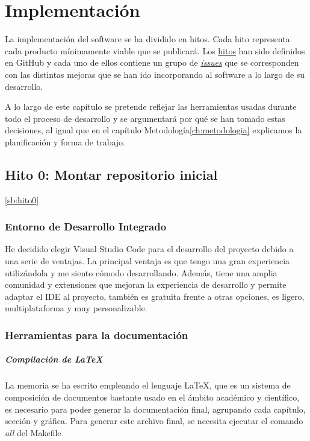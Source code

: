 \chapter{Implementación}

La implementación del software se ha dividido en hitos. Cada hito representa cada producto mínimamente viable que se publicará.
Los \href{https://github.com/RubenDelgadoPareja/TFG-Triage-Inteligente-Consulta-Medica/milestones}{hitos} han sido definidos en GitHub y
cada uno de ellos contiene un grupo de \href{https://github.com/RubenDelgadoPareja/TFG-Triage-Inteligente-Consulta-Medica/issues}{\textit{issues}} que se corresponden
con las distintas mejoras que se han ido incorporando al software a lo largo de su desarrollo.

A lo largo de este capítulo se pretende reflejar las herramientas usadas durante todo el proceso de desarrollo y
se argumentará por qué se han tomado estas decisiones, al igual que en el capítulo Metodología\ref{ch:metodologia} explicamos
la planificación y forma de trabajo.

\section{Hito 0: Montar repositorio inicial}\ref{sb:hito0}

\subsection{Entorno de Desarrollo Integrado}
He decidido elegir Visual Studio Code para el desarrollo del proyecto debido a una serie de ventajas. La principal ventaja
es que tengo una gran experiencia utilizándola y me siento cómodo desarrollando. Además, tiene una amplia comunidad y
extensiones que mejoran la experiencia de desarrollo y permite adaptar el IDE al proyecto, también es gratuita frente
a otras opciones, es ligero, multiplataforma y muy personalizable.

\subsection{Herramientas para la documentación}

\paragraph*{Compilación de LaTeX}
La memoria se ha escrito empleando el lenguaje LaTeX, que es un sistema de composición de documentos bastante usado
en el ámbito académico y científico, es necesario para poder generar la documentación final, agrupando cada capítulo, sección y
gráfica. Para generar este archivo final, se necesita ejecutar el comando \textit{all} del Makefile

